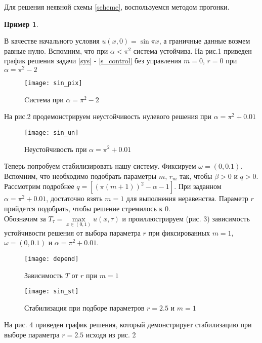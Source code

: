 Для решения неявной схемы \eqref{scheme}, воспользуемся методом прогонки.

\newtheorem{exmp}{Пример}[section]
\begin{exmp}
\end{exmp}
В качестве начального условия $u(x, 0) = \sin{\pi x}$, а граничные данные возмем равные нулю. Вспомним, что при $\alpha < \pi^2$ система устойчива. На рис.1 приведен график решения задачи \eqref{sys} - \eqref{s_control} без управления $m = 0$, $r = 0$ при $\alpha = \pi^2 - 2$

\begin{figure}[hb]
  \centering
  \texttt{[image: sin\_pix]}
  \caption{Cистема при $\alpha = \pi^2 - 2$}
\end{figure}

На рис.2 продемонстрируем неустойчивость нулевого решения при $\alpha = \pi^2 + 0.01$

\begin{figure}[H]
  \centering
  \texttt{[image: sin\_un]}
  \caption{Неустойчивость при $\alpha = \pi^2 + 0.01$}
\end{figure}

Теперь попробуем стабилизировать нашу систему. Фиксируем $\omega = (0, 0.1)$. Вспомним, что необходимо подобрать параметры $m$, $r_m$ так, чтобы $\beta > 0$ и $q > 0$. Рассмотрим подробнее $q = [(\pi(m + 1))^2 - \alpha - 1]$. При заданном $\alpha = \pi^2 + 0.01$, достаточно взять $m = 1$ для выполнения неравенства. Параметр $r$ прийдется подобрать, чтобы решение стремилось к 0.\\

Обозначим за $T_{\tau} = \max\limits_{x \in (0, 1)}{u(x, \tau)}$ и проиллюстрируем (рис. 3) зависимость устойчивости решения от выбора параметра $r$ при фиксированных $m = 1$, $\omega = (0, 0.1)$ и $\alpha = \pi^2 + 0.01$.

\begin{figure}[H]
  \centering
  \texttt{[image: depend]}
  \caption{Зависимость $T$ от $r$ при $m = 1$}
\end{figure}

\begin{figure}[H]
  \centering
  \texttt{[image: sin\_st]}
  \caption{Стабилизация при подборе параметров $r = 2.5$ и $m = 1$}
\end{figure}

На рис. 4 приведен график решения, который демонстрирует стабилизацию при выборе параметра $r = 2.5$ исходя из рис. 2

